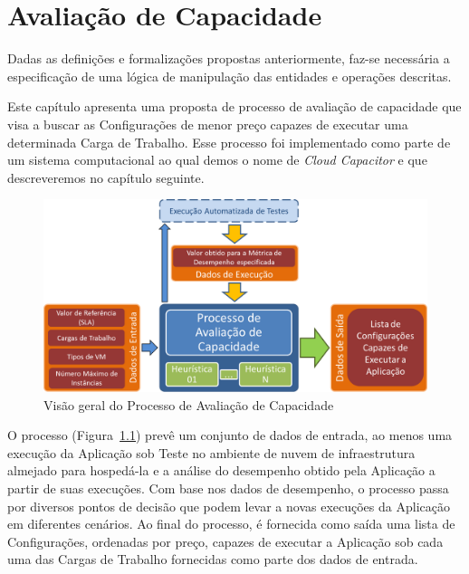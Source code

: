 \chapter{Avaliação de Capacidade}
\label{chap:processo}
Dadas as definições e formalizações propostas anteriormente, faz-se necessária
a especificação de uma lógica de manipulação das entidades e operações descritas.

Este capítulo apresenta uma proposta de processo de avaliação de capacidade
que visa a buscar as Configurações de menor preço capazes de executar uma determinada 
Carga de Trabalho. Esse processo foi implementado como parte de um sistema 
computacional ao qual demos o nome de \emph{Cloud Capacitor} e que descreveremos 
no capítulo seguinte.  

\begin{figure}
  \caption{\label{fig:fig_processo_alto_nivel}Visão geral do Processo de
  Avaliação de Capacidade}
  \begin{center}
    \includegraphics[scale=0.6]{img/processoAltoNivel}
  \end{center}
\end{figure}

O processo (Figura~\ref{fig:fig_processo_alto_nivel}) prevê um conjunto de
dados de entrada, ao menos uma execução da Aplicação sob Teste no ambiente de nuvem de infraestrutura almejado para 
hospedá-la e a análise do desempenho obtido pela Aplicação a partir 
de suas execuções. Com base nos dados de desempenho, o processo passa por diversos
pontos de decisão que podem levar a novas execuções da Aplicação em diferentes 
cenários. Ao final do processo, é fornecida como saída uma lista de Configurações, 
ordenadas por preço, capazes de executar a Aplicação sob cada uma das Cargas de 
Trabalho fornecidas como parte dos dados de entrada.

